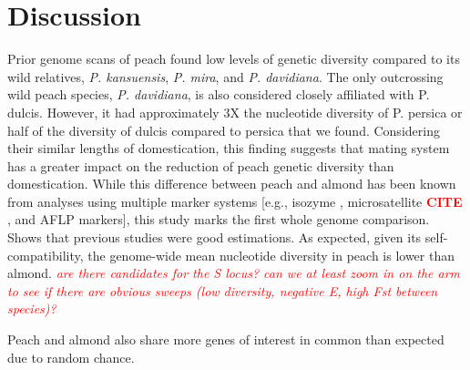 \documentclass[12pt]{article}
\newcommand{\citex}{\textcolor{red}{\bf CITE }}
\newcommand{\jri}[1]{\textcolor{red}{\emph{#1}}}
\begin{document}
\section*{Discussion}
Prior genome scans of peach found low levels of genetic diversity \citep{verde2013high} compared to its wild relatives, \emph{P. kansuensis}, \emph{P. mira}, and \emph{P. davidiana}.
The only outcrossing wild peach species, \emph{P. davidiana}, is also considered closely affiliated %
with P. dulcis. However, it had approximately 3X the nucleotide diversity of P. persica \citep{verde2013high} or half of the diversity of dulcis compared to persica that we found. 
Considering their similar lengths of domestication, this finding suggests that mating system has a greater impact on the reduction of peach genetic diversity than domestication.
%
While this difference between peach and almond has been known from analyses using multiple marker systems [e.g., isozyme \citep{mowrey1990isozyme}, microsatellite \citex, and AFLP \citep{aradhya2004molecular} markers], this study marks the first whole genome comparison.
%
Shows that previous studies were good estimations. 
As expected, given its self-compatibility, the genome-wide mean nucleotide diversity in peach is lower than almond. \jri{are there candidates for the S locus? can we at least zoom in on the arm to see if there are obvious sweeps (low diversity, negative E, high Fst between species)?}

Peach and almond also share more genes of interest in common than expected due to random chance.\\
\end{document}
